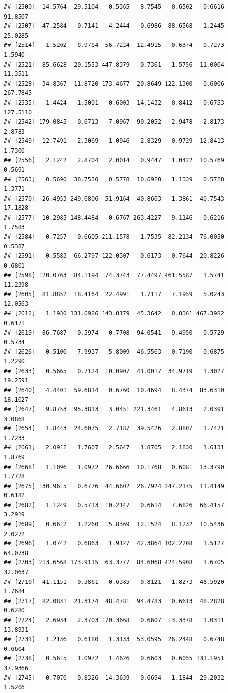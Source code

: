 \documentclass{article}\usepackage[]{graphicx}\usepackage[]{color}
\makeatletter
\newenvironment{kframe}{%
 \def\at@end@of@kframe{}%
 \ifinner\ifhmode%
  \def\at@end@of@kframe{\end{minipage}}%
  \begin{minipage}{\columnwidth}%
 \fi\fi%
 \def\FrameCommand##1{\hskip\@totalleftmargin \hskip-\fboxsep
 \colorbox{shadecolor}{##1}\hskip-\fboxsep
     \hskip-\linewidth \hskip-\@totalleftmargin \hskip\columnwidth}%
 \MakeFramed {\advance\hsize-\width
   \@totalleftmargin\z@ \linewidth\hsize
   \@setminipage}}%
 {\par\unskip\endMakeFramed%
 \at@end@of@kframe}
\newenvironment{knitrout}{}{} %
\makeatother
\begin{document}
\begin{knitrout}
\begin{kframe}
\begin{verbatim}
## [2500]  14.5764  29.5104   0.5365   8.7545   0.6502   0.6616  91.8507
## [2507]  47.2584   0.7141   4.2444   0.6986  88.6568   1.2445  25.0285
## [2514]   1.5202   8.9784  56.7224  12.4915   0.6374   0.7273   1.5940
## [2521]  85.6628  20.1553 447.8379   0.7361   1.5756  11.0004  11.3511
## [2528]  34.8367  11.8720 173.4677  20.8649 122.1300   0.6006 267.7845
## [2535]   1.4424   1.5001   0.6003  14.1432   0.8412   0.6753 127.5110
## [2542] 179.0845   0.6713   7.0967  90.2052   2.9478   2.8173   2.8783
## [2549]  12.7491   2.3069   1.0946   2.8329   0.9729  12.8413   1.7300
## [2556]   2.1242   2.8704   2.0014   0.9447   1.0422  10.5769   0.5691
## [2563]   0.5690  38.7530   0.5778  10.6920   1.1339   0.5728   1.3771
## [2570]  26.4953 249.6806  51.9164  40.8603   1.3861  40.7543  17.1828
## [2577]  10.2985 148.4484   0.6767 263.4227   9.1146   0.6216   1.7583
## [2584]   0.7257   0.6605 211.1578   1.7535  82.2134  76.0050   0.5387
## [2591]   0.5583  66.2797 122.0307   0.6173   0.7644  20.8226   0.6801
## [2598] 120.0763  84.1194  74.3743  77.4497 461.5587   1.5741  11.2398
## [2605]  81.8852  18.4164  22.4991   1.7117   7.1959   5.0243  12.0563
## [2612]   1.1930 131.6986 143.8179  45.3642   0.8361 467.3982   0.6171
## [2619]  86.7687   0.5974   0.7708  94.0541   9.4950   0.5729   0.5734
## [2626]   0.5100   7.9937   5.8009  46.5563   0.7190   0.6875   1.2290
## [2633]   0.5665   0.7124  10.0907  41.0017  34.9719   1.3027  19.2591
## [2640]   4.4401  59.6814   0.6760  10.4694   8.4374  83.6310  18.1027
## [2647]   9.8753  95.3813   3.0451 221.3461   4.8613   2.0391   3.0868
## [2654]   1.8443  24.6075   2.7187  39.5426   2.8807   1.7471   1.7233
## [2661]   2.0912   1.7607   2.5647   1.8705   2.1830   1.6131   1.8769
## [2668]   1.1096   1.0972  26.6666  10.1768   0.6081  13.3790   1.7728
## [2675] 130.9615   0.6776  44.6602  26.7924 247.2175  11.4149   0.6182
## [2682]   1.1249   0.5713  10.2147   0.6614   7.6826  66.4157   3.2919
## [2689]   0.6612   1.2260  15.8369  12.1524   8.1232  10.5436   2.0272
## [2696]   1.0742   0.6863   1.9127  42.3864 102.2208   1.5127  64.0738
## [2703] 213.6568 173.9115  63.3777  84.6068 424.5908   1.6705  32.0637
## [2710]  41.1151   0.5861   0.6385   0.8121   1.8273  48.5920   1.7684
## [2717]  82.0831  21.3174  48.4781  94.4783   0.6613  48.2828   0.6280
## [2724]   2.6934   2.3703 170.3668   0.6607  13.3378   1.0311  13.8931
## [2731]   1.2136   0.6180   1.3133  53.0595  26.2448   0.6748   0.6604
## [2738]   0.5615   1.0972   1.4626   0.6603   0.6055 131.1951  37.9366
## [2745]   0.7070   0.8326  14.3639   0.6694   1.1844  29.2032   1.5206

\end{verbatim}
\end{kframe}
\end{knitrout}
\end{document}
